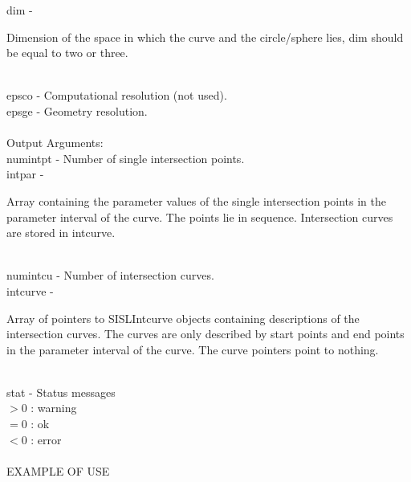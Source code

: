         \>\>    {\fov dim}      \> - \> \begin{minipg2}
                                Dimension of the space in which the
                                curve and the circle/sphere lies, {\fov dim}
                                should be equal to two or three.
                                \end{minipg2}\\[0.3ex]
        \>\>    {\fov epsco}    \> - \> Computational resolution (not used).\\
        \>\>    {\fov epsge}    \> - \> Geometry resolution.\\
\\
        \>Output Arguments:\\
        \>\>    {\fov numintpt}\> - \>  Number of single intersection points.\\
        \>\>    {\fov intpar}   \> - \> \begin{minipg2}
                        Array containing the parameter values of the
                        single intersection points in the parameter
                        interval of the curve. The points lie in sequence.
                        Intersection curves are stored in intcurve.
                                \end{minipg2}\\[0.8ex]
        \>\>    {\fov numintcu}\> - \>Number of intersection curves.\\
        \>\>    {\fov intcurve}\> - \>  \begin{minipg2}
                        Array of pointers to SISLIntcurve objects
                        containing descriptions of the intersection
                        curves. The curves are only described by start
                        points and end points in
                        the parameter interval of the curve. The curve
                        pointers point to nothing.
                                \end{minipg2}\\[0.8ex]
\newpagetabs
        \>\>    {\fov stat}     \> - \> Status messages\\
                \>\>\>\>\>              $> 0$   : warning\\
                \>\>\>\>\>              $= 0$   : ok\\
                \>\>\>\>\>              $< 0$   : error\\
\\
EXAMPLE OF USE\\
